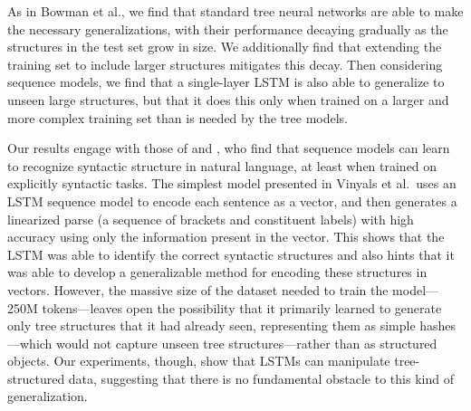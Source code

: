 As in Bowman et al., we find that standard tree neural networks are able to make the necessary generalizations, with their performance decaying gradually as the structures in the test set grow in size. We additionally find that extending the training set to include larger structures mitigates this decay. Then considering sequence models, we find that a single-layer LSTM is also able to generalize to unseen large structures, but that it does this only when trained on a larger and more complex training set than is needed by the tree models.

Our results engage with those of  and , who find that sequence models can learn to recognize syntactic structure in natural language, at least when trained on explicitly syntactic tasks. The simplest model presented in Vinyals et al.~uses an LSTM sequence model to encode each sentence as a vector, and then generates a linearized parse (a sequence of brackets and constituent labels) with high accuracy using only the information present in the vector. This shows that the LSTM was able to identify the correct syntactic structures and also hints that it was able to develop a generalizable method for encoding these structures in vectors. However, the massive size of the dataset needed to train the model---250M tokens---leaves open the possibility that it primarily learned to generate only tree structures that it had already seen, representing them as simple hashes---which would not capture unseen tree structures---rather than as structured objects.
Our experiments, though, show that LSTMs can manipulate tree-structured data, suggesting that there is no fundamental obstacle to this kind of generalization.